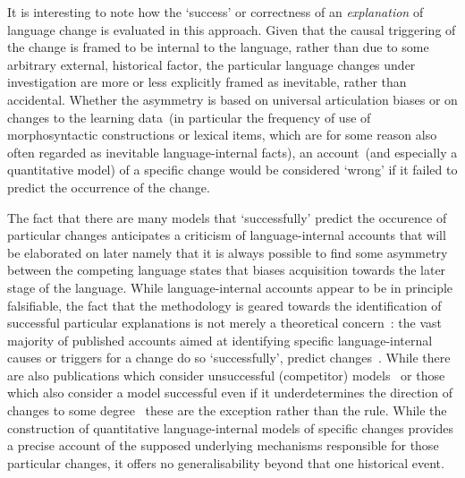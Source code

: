It is interesting to note how the `success' or correctness of an \emph{explanation} of language change is evaluated in this approach.
Given that the causal triggering of the change is framed to be internal to the language, rather than due to some arbitrary external, historical factor, the particular language changes under investigation are more or less explicitly framed as inevitable, rather than accidental.
Whether the asymmetry is based on universal articulation biases or on changes to the learning data~(in particular the frequency of use of morphosyntactic constructions or lexical items, which are for some reason also often regarded as inevitable language-internal facts), an account~(and especially a quantitative model) of a specific change would be considered `wrong' if it failed to predict the occurrence of the change.

The fact that there are many models that `successfully' predict the occurence of particular changes anticipates a criticism of language-internal accounts that will be elaborated on later namely that it is always possible to find some asymmetry between the competing language states that biases acquisition towards the later stage of the language.
While language-internal accounts appear to be in principle falsifiable, the fact that the methodology is geared towards the identification of successful particular explanations is not merely a theoretical concern~\citep{Lass1980}: the vast majority of published accounts aimed at identifying specific language-internal causes or triggers for a change do so `successfully',  predict changes~\citep[e.g.][among many others]{Niyogi1995,Yang2002,Ritt2012,VanTrijp2013}. While there are also publications which consider unsuccessful (competitor) models~\citep[e.g.][]{Sonderegger2010} or those which also consider a model successful even if it underdetermines the direction of changes to some degree~\citep[e.g.][]{Lau2016} these are the exception rather than the rule.
While the construction of quantitative language-internal models of specific changes provides a precise account of the supposed underlying mechanisms responsible for those particular changes, it offers no generalisability beyond that one historical event. %

